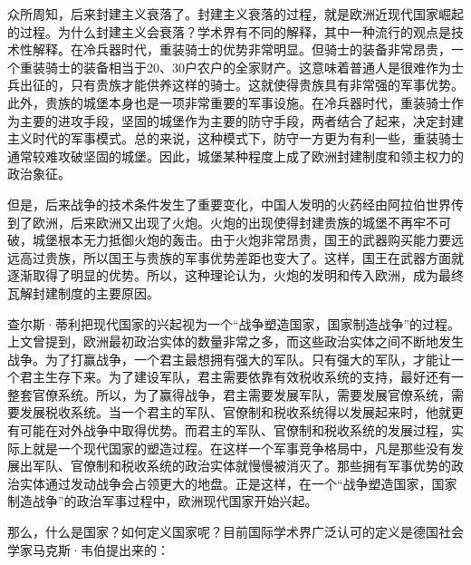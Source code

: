 众所周知，后来封建主义衰落了。封建主义衰落的过程，就是欧洲近现代国家崛起的过程。为什么封建主义会衰落？学术界有不同的解释，其中一种流行的观点是技术性解释。在冷兵器时代，重装骑士的优势非常明显。但骑士的装备非常昂贵，一个重装骑士的装备相当于20、30户农户的全家财产。这意味着普通人是很难作为士兵出征的，只有贵族才能供养这样的骑士。这就使得贵族具有非常强的军事优势。此外，贵族的城堡本身也是一项非常重要的军事设施。在冷兵器时代，重装骑士作为主要的进攻手段，坚固的城堡作为主要的防守手段，两者结合了起来，决定封建主义时代的军事模式。总的来说，这种模式下，防守一方更为有利一些，重装骑士通常较难攻破坚固的城堡。因此，城堡某种程度上成了欧洲封建制度和领主权力的政治象征。

但是，后来战争的技术条件发生了重要变化，中国人发明的火药经由阿拉伯世界传到了欧洲，后来欧洲又出现了火炮。火炮的出现使得封建贵族的城堡不再牢不可破，城堡根本无力抵御火炮的轰击。由于火炮非常昂贵，国王的武器购买能力要远远高过贵族，所以国王与贵族的军事优势差距也变大了。这样，国王在武器方面就逐渐取得了明显的优势。所以，这种理论认为，火炮的发明和传入欧洲，成为最终瓦解封建制度的主要原因。

查尔斯·蒂利把现代国家的兴起视为一个“战争塑造国家，国家制造战争”的过程。上文曾提到，欧洲最初政治实体的数量非常之多，而这些政治实体之间不断地发生战争。为了打赢战争，一个君主最想拥有强大的军队。只有强大的军队，才能让一个君主生存下来。为了建设军队，君主需要依靠有效税收系统的支持，最好还有一整套官僚系统。所以，为了赢得战争，君主需要发展军队，需要发展官僚系统，需要发展税收系统。当一个君主的军队、官僚制和税收系统得以发展起来时，他就更有可能在对外战争中取得优势。而君主的军队、官僚制和税收系统的发展过程，实际上就是一个现代国家的塑造过程。在这样一个军事竞争格局中，凡是那些没有发展出军队、官僚制和税收系统的政治实体就慢慢被消灭了。那些拥有军事优势的政治实体通过发动战争会占领更大的地盘。正是这样，在一个“战争塑造国家，国家制造战争”的政治军事过程中，欧洲现代国家开始兴起。


那么，什么是国家？如何定义国家呢？目前国际学术界广泛认可的定义是德国社会学家马克斯·韦伯提出来的：


